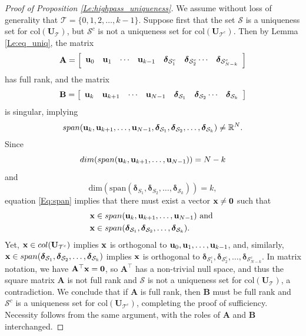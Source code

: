 \documentclass[journal, 10pt]{IEEEtran}
\begin{document}
\begin{proof}[Proof of Proposition \ref{Le:highpass_uniqueness}]
We assume without loss of generality that ${\mathcal T}=\{0,1,2,\ldots,k-1\}$. 
Suppose first that the set $\mathcal{S}$ is a uniqueness set for $\mbox{col}({\mathbf{U}}_{\mathcal T})$, but $\mathcal{S}^c$ is not a uniqueness set for $\mbox{col}({\mathbf{U}}_{{\mathcal T}^c})$. Then by Lemma \ref{Le:eq_uniq}, the matrix $$\mathbf{A}=
 \left[ \begin{array}{cccccccc}
{\bf u}_{0} & {\bf u}_{1} & \cdots & {\bf u}_{k-1} & {\boldsymbol \delta}_{{\mathcal{S}}^c_1} & {\boldsymbol \delta}_{{\mathcal{S}}^c_2} \cdots & {\boldsymbol \delta}_{{\mathcal{S}}^c_{N-k}} \end{array} \right]$$
has full rank, and the matrix $$\mathbf{B}=
 \left[ \begin{array}{cccccccc}
{\bf u}_{k} & {\bf u}_{k+1} & \cdots & {\bf u}_{N-1} & {\boldsymbol \delta}_{\mathcal{S}_{1}} & {\boldsymbol \delta}_{\mathcal{S}_{2}} \cdots & {\boldsymbol \delta}_{\mathcal{S}_k} \end{array} \right]$$
is singular, implying
\begin{align}\label{Eq:span}
\mbox{span}({\bf u}_{k}, {\bf u}_{k+1},\ldots, {\bf u}_{N-1}, {\boldsymbol \delta}_{\mathcal{S}_{1}}, {\boldsymbol \delta}_{\mathcal{S}_{2}}, \ldots, {\boldsymbol \delta}_{\mathcal{S}_k}) \neq \mathbb{R}^N.
\end{align}
Since 
$$\mbox{dim}(\mbox{span}({\bf u}_{k}, {\bf u}_{k+1},\ldots, {\bf u}_{N-1}))=N-k$$ and $$\mbox{dim}(\mbox{span}({\boldsymbol \delta}_{S_{1}}, {\boldsymbol \delta}_{S_{2}}, \ldots, {\boldsymbol \delta}_{\mathcal{S}_k}))=k,$$ equation 
\eqref{Eq:span} implies that
there must exist a vector ${\bf x} \neq {\bf 0}$ such that 
\begin{align*}
&{\bf x} \in  \mbox{span}({\bf u}_{k}, {\bf u}_{k+1},\ldots, {\bf u}_{N-1})  \hbox{ and } \\
& {\bf x} \in \mbox{span}({\boldsymbol \delta}_{\mathcal{S}_{1}}, {\boldsymbol \delta}_{\mathcal{S}_{2}}, \ldots, {\boldsymbol \delta}_{\mathcal{S}_{k}}).\end{align*}
Yet, ${\bf x} \in \mbox{col}({\mathbf{U}}_{{\mathcal T}^c})$ implies ${\bf x}$ is orthogonal to  ${\bf u}_0, {\bf u}_1, \ldots, {\bf u}_{k-1}$, and, similarly, 
${\bf x} \in \mbox{span}({\boldsymbol \delta}_{\mathcal{S}_{1}}, {\boldsymbol \delta}_{\mathcal{S}_{2}}, \ldots, {\boldsymbol \delta}_{\mathcal{S}_{k}})$ implies ${\bf x}$ is orthogonal to ${\boldsymbol \delta}_{\mathcal{S}^c_{1}}, {\boldsymbol \delta}_{\mathcal{S}^c_{2}}, \ldots, {\boldsymbol \delta}_{\mathcal{S}^c_{N-k}}.$
In matrix notation, we have $\mathbf{A}^{\top}{\bf x}={\bf 0}$, so $\mathbf{A}^{\top}$ has a non-trivial null space, and thus the square matrix $\mathbf{A}$ is not full rank and $\mathcal{S}$ is not a uniqueness set for $\mbox{col}({\mathbf{U}}_{\mathcal T})$, a contradiction. We conclude that if $\mathbf{A}$ is full rank, then $\mathbf{B}$ must be full rank and $\mathcal{S}^c$ is a uniqueness set for $\mbox{col}({\mathbf{U}}_{{\mathcal T}^c})$, completing the proof of sufficiency. Necessity follows from the same argument, with the roles of $\mathbf{A}$ and $\mathbf{B}$ interchanged.
\end{proof}
\end{document}
